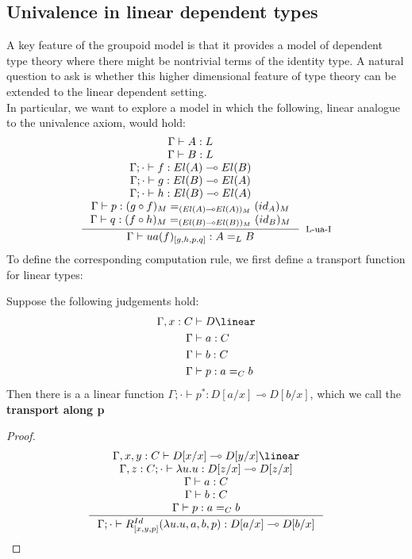 \subsection{Univalence in linear dependent types}\label{highermodel}
A key feature of the groupoid model is that it provides a model of dependent type theory where there might be nontrivial terms of the identity type. A natural question to ask is whether this higher dimensional feature of type theory can be extended to the linear dependent setting.\\
In particular, we want to explore a model in which the following, linear analogue to the univalence axiom, would hold:
\[
  \inference{
    \Gamma \vdash A : L\\
    \Gamma \vdash B : L\\
    \Gamma; \cdot \vdash f : El(A) \multimap El(B)\\
    \Gamma; \cdot \vdash g : El(B) \multimap El(A)\\
    \Gamma; \cdot \vdash h : El(B) \multimap El(A)\\
    \Gamma \vdash p : (g \circ f)_M  =_{(El(A) \multimap El(A))_M} (id_A)_M\\
    \Gamma \vdash q : (f \circ h)_M =_{(El(B) \multimap El(B))_M} (id_B)_M\\
    }{\Gamma \vdash ua(f)_{[g, h, p, q]} : A =_L B}[L-ua-I]
  \]
  To define the corresponding computation rule, we first define a transport function for linear types:
  \begin{lemm}
    Suppose the following judgements hold:
    \[
      \begin{split}
        \Gamma, x : C &\vdash D \linear\\
        \Gamma &\vdash a : C\\
        \Gamma &\vdash b : C\\
        \Gamma &\vdash p : a =_C b
        \end{split}
      \]
      Then there is a a linear function $\Gamma; \cdot \vdash p^* : D[a/x] \multimap D[b/x]$, which we call the \textbf{transport along p}
      \begin{proof}
        \[
          \inference{
\Gamma, x, y : C \vdash D[x/x] \multimap D[y/x] \linear\\
\Gamma, z : C ; \cdot \vdash \lambda u.u :D[z/x] \multimap D[z/x]\\
\Gamma \vdash a : C\\
\Gamma \vdash b : C\\
\Gamma \vdash p : a=_C b
}
{\Gamma; \cdot \vdash R^{Id}_{[x, y, p]}(\lambda u.u, a, b, p) : D[a/x] \multimap D[b/x]}
\]
      \end{proof}
    \end{lemm}
